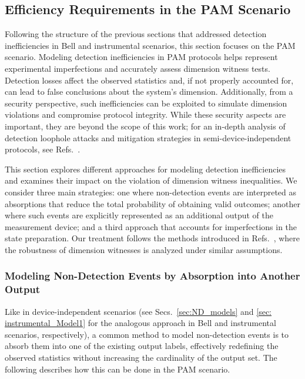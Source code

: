 \documentclass[aps,pra,reprint, superscriptaddress,showkeys]{revtex4-2}
\theoremstyle{plain}
\begin{document}
\subsection{Efficiency Requirements in the PAM Scenario}
Following the structure of the previous sections that addressed detection inefficiencies in Bell and instrumental scenarios, this section focuses on the PAM scenario. Modeling detection inefficiencies in PAM protocols helps represent experimental imperfections and accurately assess dimension witness tests. Detection losses affect the observed statistics and, if not properly accounted for, can lead to false conclusions about the system's dimension. Additionally, from a security perspective, such inefficiencies can be exploited to simulate dimension violations and compromise protocol integrity. While these security aspects are important, they are beyond the scope of this work; for an in-depth analysis of detection loophole attacks and mitigation strategies in semi-device-independent protocols, see Refs.~\cite{DallArno2015, Mironowicz2021}.

This section explores different approaches for modeling detection inefficiencies and examines their impact on the violation of dimension witness inequalities. We consider three main strategies: one where non-detection events are interpreted as absorptions that reduce the total probability of obtaining valid outcomes; another where such events are explicitly represented as an additional output of the measurement device; and a third approach that accounts for imperfections in the state preparation. Our treatment follows the methods introduced in Refs.~\cite{li2015, dallarno2012}, where the robustness of dimension witnesses is analyzed under similar assumptions.

\subsubsection{Modeling Non-Detection Events by Absorption into Another Output}
\label{sec: pam_absorption}
Like in device-independent scenarios (see Secs.~\ref{sec:ND_models} and \ref{sec: instrumental_Model1} for the analogous approach in Bell and instrumental scenarios, respectively), a common method to model non-detection events is to absorb them into one of the existing output labels, effectively redefining the observed statistics without increasing the cardinality of the output set. The following describes how this can be done in the PAM scenario.
\end{document}
